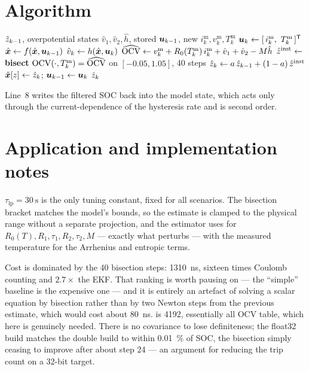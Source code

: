 \section{Algorithm}
\begin{algorithm}[H]
\caption{OCV inversion with IR/RC compensation --- one sampling period}
\begin{algorithmic}[1]
\Require $\hat{z}_{k-1}$, overpotential states $\hat v_{1},\hat v_{2},\hat h$, stored $\bm{u}_{k-1}$, new $i^{\text{m}}_k, v^{\text{m}}_k, T^{\text{m}}_k$
\State $\vu_k \gets [\,i^{\text{m}}_k,\ T^{\text{m}}_k\,]^\T$
 \State $\hat{\bm{x}} \gets f(\hat{\bm{x}},\bm{u}_{k-1})$ 
\EndIf
\State $\hat v_k \gets h(\hat{\bm{x}},\bm{u}_k)$ 
\State $\widehat{\mathrm{OCV}} \gets v^{\text{m}}_k + R_0(T^{\text{m}}_k)\,i^{\text{m}}_k + \hat v_1 + \hat v_2 - M\hat h$
\State $\hat{z}^{\text{inst}} \gets$ \textbf{bisect} $\mathrm{OCV}(\cdot,T^{\text{m}}_k) = \widehat{\mathrm{OCV}}$ on $[-0.05,1.05]$, 40 steps
\State $\hat{z}_k \gets a\,\hat{z}_{k-1} + (1-a)\,\hat{z}^{\text{inst}}$
\State $\hat{\bm{x}}[z] \gets \hat{z}_k$; \quad $\bm{u}_{k-1}\gets\bm{u}_k$
\Ensure $\hat{z}_k$
\end{algorithmic}
\end{algorithm}
Line~8 writes the filtered SOC back into the model state, which acts only through the
current-dependence of the hysteresis rate and is second order.

\section{Application and implementation notes}
$\tau_{\text{lp}} = \SI{30}{\second}$ is the only tuning constant, fixed for all scenarios. The
bisection bracket matches the model's  bounds, so the estimate is clamped to the
physical range without a separate projection, and the estimator uses 
for $R_0(T),R_1,\tau_1,R_2,\tau_2,M$ --- exactly what  perturbs --- with the
measured temperature for the Arrhenius and entropic terms.

Cost is dominated by the 40 bisection steps: \SI{1310}{\nano\second}, sixteen times Coulomb counting
and $2.7\times$ the EKF. That ranking is worth pausing on --- the ``simple'' baseline is the
expensive one --- and it is entirely an artefact of solving a scalar equation by bisection rather
than by two Newton steps from the previous estimate, which would cost about \SI{80}{\nano\second}.
 is \SI{4192}{\byte}, essentially all OCV table, which here is genuinely needed. There
is no covariance to lose definiteness; the float32 build matches the double build to within
\SI{0.01}{\percent} of SOC, the bisection simply ceasing to improve after about step 24 --- an
argument for reducing the trip count on a 32-bit target.

